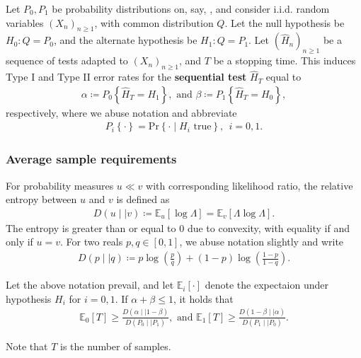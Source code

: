 \begin{defn}{}{}
Let \(P_0, P_1\) be probability distributions on, say, \R{}, and consider i.i.d. random variables \((X_{n} )_{n \geq 1}\), with common distribution \(Q\). Let the null hypothesis be \(H_0 :Q = P_0\), and the alternate hypothesis be \(H_1 :Q = P_1\). Let \((\hat{H} _{n} )_{n \geq 1} \) be a sequence of tests adapted to \((X_{n}  )_{n \geq 1} \), and \(T\) be a stopping time. This induces Type I and Type II error rates for the \textbf{sequential test} \(\hat{H} _{T} \) equal to 
\begin{align*}
    \alpha \coloneqq P_0 \left\{ \hat{H} _{T} = H_1 \right\}, \text{ and } \beta \coloneqq P_1 \left\{ \hat{H} _{T} = H_ 0 \right\},
\end{align*}
respectively, where we abuse notation and abbreviate
\begin{align*}
    P _{i} \left\{ \cdot  \right\} = \mathrm{Pr} \left\{ \cdot \mid H_{i} \text{ true}  \right\}, \ \ i = 0, 1. 
\end{align*}



\end{defn}

\subsubsection{Average sample requirements}
\begin{defn}{}{}
    For probability measures \(u \ll v\) with corresponding likelihood ratio, the relative entropy between \(u\) and \(v\) is defined as 
    \begin{align*}
        D(u \mid \mid v)\coloneqq \mathbb{E} _{u} [\log \Lambda ] = \mathbb{E} _{v} [\Lambda \log \Lambda ].
    \end{align*}
The entropy is greater than or equal to 0 due to convexity, with equality if and only if \(u = v    \). For two reals \(p,q\in [0,1]\), we abuse notation slightly and write
\begin{align*}
    D(p \mid \mid q) \coloneqq p\log (\frac{p}{q})+(1 - p)\log (\frac{1 - p}{1 - q  }). 
\end{align*}

\end{defn}
    

\begin{thrm}{}{}
Let the above notation prevail, and let \(\mathbb{E}_{i} [\cdot ] \) denote the expectaion under hypothesis \(H_{i} \) for \(i = 0,1\). If \(\alpha +\beta \leq 1\), it holds that
\begin{align*}
    \mathbb{E} _0[T] \geq \frac{D(\alpha \mid \mid 1 -\beta )}{D(P_0 \mid \mid P_1)}, \text{ and } \mathbb{E} _1[T]\geq \frac{D(1 -\beta \mid \mid \alpha )}{D(P_1 \mid \mid P_0)}. 
\end{align*}

Note that \(T\) is the number of samples. 

\end{thrm}

